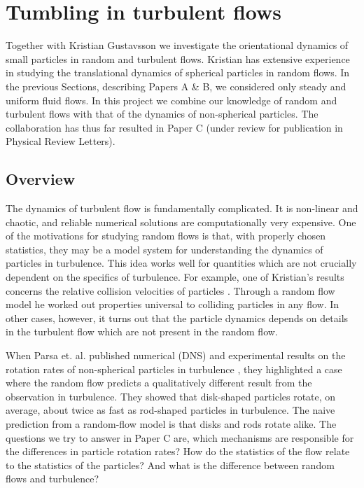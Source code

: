 \documentclass[thesis.tex]{subfiles}
\begin{document}
\chapter{Tumbling in turbulent flows}

Together with Kristian Gustavsson we investigate the orientational dynamics of small particles in random and turbulent flows. Kristian has extensive experience in studying the translational dynamics of spherical particles in random flows. In the previous Sections, describing Papers A \& B, we considered only steady and uniform fluid flows. In this project we combine our knowledge of random and turbulent flows with that of the dynamics of non-spherical particles. The collaboration has thus far resulted in Paper C (under review for publication in Physical Review Letters).

\section{Overview}

The dynamics of turbulent flow is fundamentally complicated. It is non-linear and chaotic, and reliable numerical solutions are computationally very expensive. One of the motivations for studying random flows is that, with properly chosen statistics, they may be a model system for understanding the dynamics of particles in turbulence. 
This idea works well for quantities which are not crucially dependent on the specifics of turbulence. For example, one of Kristian's results concerns the relative collision velocities of particles \cite{gustavsson2013relvel}. Through a random flow model he worked out properties universal to colliding particles in any flow. In other cases, however, it turns out that the particle dynamics depends on details in the turbulent flow which are not present in the random flow.

When Parsa et. al. published numerical (DNS) and experimental results on the rotation rates of non-spherical particles in turbulence \cite{parsa2012}, they highlighted a case where the random flow predicts a qualitatively different result from the observation in turbulence. They showed that disk-shaped particles rotate, on average, about twice as fast as rod-shaped particles in turbulence. The naive prediction from a random-flow model is that disks and rods rotate alike. The questions we try to answer in Paper C are, which mechanisms are responsible for the differences in particle rotation rates? How do the statistics of the flow relate to the statistics of the particles? And what is the difference between random flows and turbulence?
\end{document}
